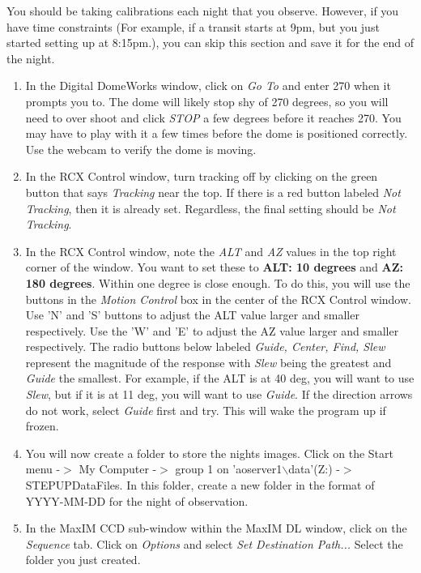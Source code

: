 \documentclass[11pt]{report}
\begin{document}
You should be taking calibrations each night that you observe. However, if you have time constraints (For example, if a transit starts at 9pm, but you just started setting up at 8:15pm.), you can skip this section and save it for the end of the night. 
\begin{enumerate}
\item In the Digital DomeWorks window, click on \emph{Go To} and enter 270 when it prompts you to. The dome will likely stop shy of 270 degrees, so you will need to over shoot and click \emph{STOP} a few degrees before it reaches 270. You may have to play with it a few times before the dome is positioned correctly. Use the webcam to verify the dome is moving. 
\item In the RCX Control window, turn tracking off by clicking on the green button that says \emph{Tracking} near the top. If there is a red button labeled \emph{Not Tracking}, then it is already set. Regardless, the final setting should be \emph{Not Tracking}.
\item In the RCX Control window, note the \emph{ALT} and \emph{AZ} values in the top right corner of the window. You want to set these to {\bf ALT: 10 degrees} and {\bf AZ: 180 degrees}. Within one degree is close enough. To do this, you will use the buttons in the \emph{Motion Control} box in the center of the RCX Control window. Use 'N' and 'S' buttons to adjust the ALT value larger and smaller respectively. Use the 'W' and 'E' to adjust the AZ value larger and smaller respectively. The radio buttons below labeled \emph{Guide, Center, Find, Slew} represent the magnitude of the response with \emph{Slew} being the greatest and \emph{Guide} the smallest. For example, if the ALT is at 40 deg, you will want to use \emph{Slew}, but if it is at 11 deg, you will want to use \emph{Guide}. If the direction arrows do not work, select \emph{Guide} first and try. This will wake the program up if frozen.
\item You will now create a folder to store the nights images. Click on the Start menu -{$>$} My Computer -{$>$} group 1 on 'aoserver1{$\backslash$}data'(Z:) -{$>$} STEPUPDataFiles. In this folder, create a new folder in the format of YYYY-MM-DD for the night of observation.
\item In the MaxIM CCD sub-window within the MaxIM DL window, click on the \emph{Sequence} tab. Click on \emph{Options} and select \emph{Set Destination Path...} Select the folder you just created.

\end{enumerate}
\end{document}
